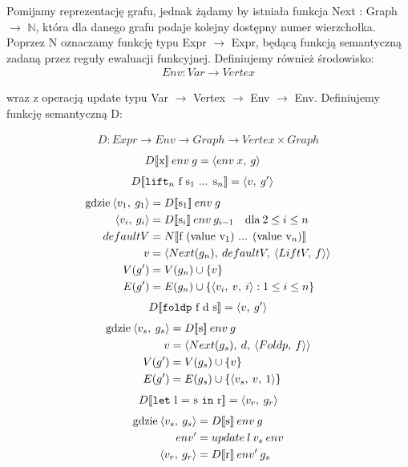 \documentclass[11pt,leqno]{article}
\newcommand{\denote}[1]{\text{$[\![ $#1$ ]\!]$}}
\begin{document}
Pomijamy reprezentację grafu, jednak żądamy by istniała funkcja Next : Graph $\rightarrow$ $\mathbb N$, która dla danego grafu podaje kolejny dostępny numer wierzchołka. Poprzez N oznaczamy funkcję typu Expr $\rightarrow$ Expr, będącą funkcją semantyczną zadaną przez reguły ewaluacji funkcyjnej. Definiujemy również środowisko:
\begin{gather*}
Env : Var \rightarrow Vertex  
\end{gather*}

wraz z operacją update typu Var $\rightarrow$ Vertex $\rightarrow$ Env $\rightarrow$ Env. Definiujemy funkcję semantyczną D:

\begin {align*}
D : Expr \rightarrow Env \rightarrow Graph \rightarrow Vertex \times Graph
\end {align*}
\begin {align*}
D\denote{x}\:env\:g &= \langle env\:x,\:g \rangle
\end {align*}
\begin {align*}
D\denote{\texttt{lift$_{n}$} f s$_{1}$ ... s$_{n}$} &= \langle v,\:g' \rangle
\end {align*}
\begin {align*}
\text{gdzie} \: \langle v_{1},\:g_{1} \rangle &= D\denote{s$_{1}$}\:env\:g \\
\langle v_{i},\:g_{i} \rangle &= D\denote{s$_{i}$}\:env\:g_{i-1} \quad \text{dla}\:2 \leq i \leq n \\
defaultV &= N\denote{f (value v$_{1}$) ... (value v$_{n}$)} \\
v &= \langle Next(g_{n}),\:defaultV,\:\langle LiftV,\:f \rangle \rangle \\
V(g') &= V(g_{n}) \cup \left\{ {v}\right\} \\
E(g') &= E(g_{n}) \cup \{\langle v_{i},\:v,\:i \rangle : 1 \leq i \leq n\}
\end {align*}
\begin {align*}
D\denote{\texttt{foldp} f d s} = \langle v,\:g' \rangle
\end {align*}
\begin {align*}
\text{gdzie} \: \langle v_{s},\:g_{s} \rangle &= D\denote{s}\:env\:g \\
v &= \langle Next(g_{s}),\:d,\:\langle Foldp,\:f \rangle \rangle \\
V(g') &= V(g_{s}) \cup \left\{ {v}\right\} \\
E(g') &= E(g_{s}) \cup \{\langle v_{s},\:v,\:1 \rangle \}
\end {align*}
\begin {align*}
D\denote{\texttt{let} l = s \texttt{in} r} = \langle v_{r},\:g_{r} \rangle
\end {align*}
\begin {align*}
\text{gdzie} \: \langle v_{s},\:g_{s} \rangle &= D\denote{s}\:env\:g \\
env' &= update\:l\:v_{s}\:env \\
\langle v_{r},\:g_{r} \rangle &= D\denote{r}\:env'\:g_{s}
\end{align*}
\end{document}
